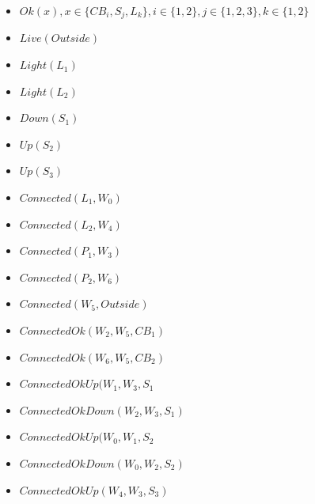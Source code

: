 \documentclass[10pt, a4paper,spanish]{article}
\begin{document}
			\begin{itemize}
				\item $ Ok(x),  x \in \{CB_i, S_j, L_k\}, i \in \{1,2\}, j \in \{1,2,3\},k \in \{1,2\}$
				\item $ Live(Outside)$
				\item $ Light(L_1)$
				\item $ Light(L_2)$
				\item $ Down(S_1)$
				\item $ Up(S_2)$
				\item $ Up(S_3)$
				\item $ Connected(L_1, W_0)$
				\item $ Connected(L_2, W_4)$
				\item $ Connected(P_1, W_3)$
				\item $ Connected(P_2, W_6)$
				\item $ Connected(W_5, Outside)$


				\item $ ConnectedOk(W_2, W_5, CB_1)$
				\item $ ConnectedOk(W_6, W_5, CB_2)$

				\item $ ConnectedOkUp(W_1, W_3, S_1$
				\item $ ConnectedOkDown(W_2, W_3, S_1)$

				\item $ ConnectedOkUp(W_0, W_1, S_2$
				\item $ ConnectedOkDown(W_0, W_2, S_2)$


				\item $ ConnectedOkUp(W_4, W_3, S_3)$
			\end{itemize}
\end{document}
